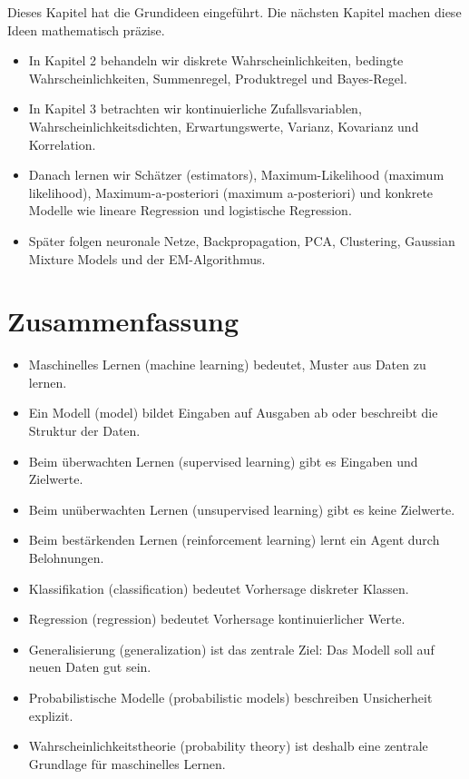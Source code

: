 Dieses Kapitel hat die Grundideen eingeführt.
Die nächsten Kapitel machen diese Ideen mathematisch präzise.

\begin{itemize}
    \item In Kapitel 2 behandeln wir diskrete Wahrscheinlichkeiten, bedingte Wahrscheinlichkeiten, Summenregel, Produktregel und Bayes-Regel.
    \item In Kapitel 3 betrachten wir kontinuierliche Zufallsvariablen, Wahrscheinlichkeitsdichten, Erwartungswerte, Varianz, Kovarianz und Korrelation.
    \item Danach lernen wir Schätzer (estimators), Maximum-Likelihood (maximum likelihood), Maximum-a-posteriori (maximum a-posteriori) und konkrete Modelle wie lineare Regression und logistische Regression.
    \item Später folgen neuronale Netze, Backpropagation, PCA, Clustering, Gaussian Mixture Models und der EM-Algorithmus.
\end{itemize}

\section{Zusammenfassung}

\begin{itemize}
    \item Maschinelles Lernen (machine learning) bedeutet, Muster aus Daten zu lernen.
    \item Ein Modell (model) bildet Eingaben auf Ausgaben ab oder beschreibt die Struktur der Daten.
    \item Beim überwachten Lernen (supervised learning) gibt es Eingaben und Zielwerte.
    \item Beim unüberwachten Lernen (unsupervised learning) gibt es keine Zielwerte.
    \item Beim bestärkenden Lernen (reinforcement learning) lernt ein Agent durch Belohnungen.
    \item Klassifikation (classification) bedeutet Vorhersage diskreter Klassen.
    \item Regression (regression) bedeutet Vorhersage kontinuierlicher Werte.
    \item Generalisierung (generalization) ist das zentrale Ziel: Das Modell soll auf neuen Daten gut sein.
    \item Probabilistische Modelle (probabilistic models) beschreiben Unsicherheit explizit.
    \item Wahrscheinlichkeitstheorie (probability theory) ist deshalb eine zentrale Grundlage für maschinelles Lernen.
\end{itemize}

